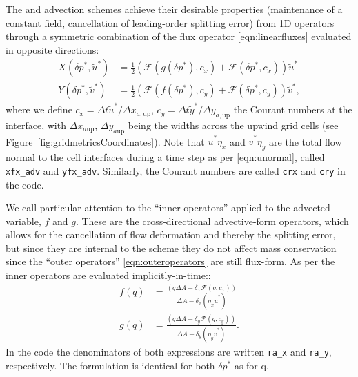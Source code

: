 \documentclass[10pt,letterpaper,margin=1in]{memoir}
\begin{document}
The \citet{LR96} and \citet{PL07} advection schemes achieve their desirable properties (maintenance of a constant field, cancellation of leading-order splitting error) from 1D operators through a symmetric combination of the flux operator \eqref{eqn:linearfluxes} evaluated in opposite directions:
\begin{equation} \label{eqn:dirfluxes}
\begin{aligned}
X(\delta p^*, \widetilde{u}^*) &= \frac{1}{2} \left ( \mathcal{F} \left (  g(\delta p^*), c_x \right ) + \mathcal{F} \left ( \delta p^*, c_x \right ) \right )\widetilde{u}^* \\
Y(\delta p^*, \widetilde{v}^*) &= \frac{1}{2} \left ( \mathcal{F} \left (  f(\delta p^*), c_y \right ) + \mathcal{F} \left ( \delta p^*, c_y \right ) \right )\widetilde{v}^* ,
\end{aligned}
\end{equation}
where we define $c_x = \Delta t \widetilde{u}^*/\Delta x_{a,\text{up}}$, $c_y = \Delta t \widetilde{y}^*/\Delta y_{a,\text{up}}$ the Courant numbers at the interface, with $\Delta x_{a\text{up}}$, $\Delta y_{a\text{up}}$ being the widths across the upwind grid cells (see Figure~\ref{fig:gridmetricsCoordinates}). Note that $ \tilde{u}^* \eta_x$ and $\tilde{v}^* \eta_y$ are the total flow normal to the cell interfaces during a time step as per \eqref{eqn:unormal}, called \texttt{xfx_adv} and \texttt{yfx_adv}. Similarly, the Courant numbers are called \texttt{crx} and \texttt{cry} in the code. 

We call particular attention to the ``inner operators'' applied to the advected variable, $f$ and $g$. These are the cross-directional advective-form operators, which allows for the cancellation of flow deformation and thereby the splitting error, but since they are internal to the scheme they do not affect mass conservation since the ``outer operators'' \eqref{eqn:outeroperators} are still flux-form. As per \citet{PL07} the inner operators are evaluated implicitly-in-time::
\begin{equation}
\begin{aligned}
f(q) &=   \frac{\left ( q\Delta A - \delta_x \mathcal{F}(q, c_x)  \right )}{\Delta A - \delta_x (\eta_x \widetilde{u}^*)} \\
g(q) &=   \frac{\left ( q\Delta A - \delta_y \mathcal{F}(q, c_y)  \right )}{\Delta A - \delta_y (\eta_y \widetilde{v}^*)}.
\end{aligned}
\end{equation}
In the code the denominators of both expressions are written \texttt{ra_x} and \texttt{ra_y}, respectively. The formulation is identical for both $\delta p^*$ as for q.
\end{document}
